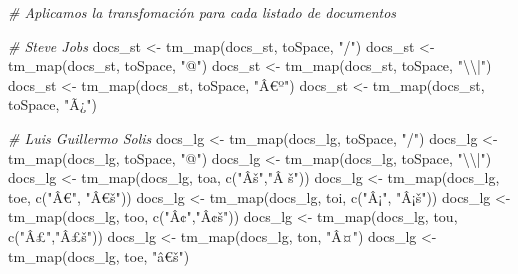 \documentclass[
]{article}
\newenvironment{Shaded}{\begin{snugshade}}{\end{snugshade}}
\newcommand{\CommentTok}[1]{\textcolor[rgb]{0.56,0.35,0.01}{\textit{#1}}}
\newcommand{\FunctionTok}[1]{\textcolor[rgb]{0.00,0.00,0.00}{#1}}
\newcommand{\NormalTok}[1]{#1}
\newcommand{\OtherTok}[1]{\textcolor[rgb]{0.56,0.35,0.01}{#1}}
\newcommand{\SpecialCharTok}[1]{\textcolor[rgb]{0.00,0.00,0.00}{#1}}
\newcommand{\StringTok}[1]{\textcolor[rgb]{0.31,0.60,0.02}{#1}}
\begin{document}
\begin{Shaded}
\begin{Highlighting}[]
\CommentTok{\# Aplicamos la transfomación para cada listado de documentos}

\CommentTok{\# Steve Jobs}
\NormalTok{docs\_st }\OtherTok{\textless{}{-}} \FunctionTok{tm\_map}\NormalTok{(docs\_st, toSpace, }\StringTok{"/"}\NormalTok{)}
\NormalTok{docs\_st }\OtherTok{\textless{}{-}} \FunctionTok{tm\_map}\NormalTok{(docs\_st, toSpace, }\StringTok{"@"}\NormalTok{)}
\NormalTok{docs\_st }\OtherTok{\textless{}{-}} \FunctionTok{tm\_map}\NormalTok{(docs\_st, toSpace, }\StringTok{"}\SpecialCharTok{\textbackslash{}\textbackslash{}}\StringTok{|"}\NormalTok{)}
\NormalTok{docs\_st }\OtherTok{\textless{}{-}} \FunctionTok{tm\_map}\NormalTok{(docs\_st, toSpace, }\StringTok{"Â€º"}\NormalTok{)}
\NormalTok{docs\_st }\OtherTok{\textless{}{-}} \FunctionTok{tm\_map}\NormalTok{(docs\_st, toSpace, }\StringTok{"Ã¿"}\NormalTok{)}

\CommentTok{\# Luis Guillermo Solis}
\NormalTok{docs\_lg }\OtherTok{\textless{}{-}} \FunctionTok{tm\_map}\NormalTok{(docs\_lg, toSpace, }\StringTok{"/"}\NormalTok{)}
\NormalTok{docs\_lg }\OtherTok{\textless{}{-}} \FunctionTok{tm\_map}\NormalTok{(docs\_lg, toSpace, }\StringTok{"@"}\NormalTok{)}
\NormalTok{docs\_lg }\OtherTok{\textless{}{-}} \FunctionTok{tm\_map}\NormalTok{(docs\_lg, toSpace, }\StringTok{"}\SpecialCharTok{\textbackslash{}\textbackslash{}}\StringTok{|"}\NormalTok{)}
\NormalTok{docs\_lg }\OtherTok{\textless{}{-}} \FunctionTok{tm\_map}\NormalTok{(docs\_lg, toa, }\FunctionTok{c}\NormalTok{(}\StringTok{"Âš"}\NormalTok{,}\StringTok{"Â š"}\NormalTok{))}
\NormalTok{docs\_lg }\OtherTok{\textless{}{-}} \FunctionTok{tm\_map}\NormalTok{(docs\_lg, toe, }\FunctionTok{c}\NormalTok{(}\StringTok{"Â€"}\NormalTok{, }\StringTok{"Â€š"}\NormalTok{))}
\NormalTok{docs\_lg }\OtherTok{\textless{}{-}} \FunctionTok{tm\_map}\NormalTok{(docs\_lg, toi, }\FunctionTok{c}\NormalTok{(}\StringTok{"Â¡"}\NormalTok{, }\StringTok{"Â¡š"}\NormalTok{))}
\NormalTok{docs\_lg }\OtherTok{\textless{}{-}} \FunctionTok{tm\_map}\NormalTok{(docs\_lg, too, }\FunctionTok{c}\NormalTok{(}\StringTok{"Â¢"}\NormalTok{,}\StringTok{"Â¢š"}\NormalTok{))}
\NormalTok{docs\_lg }\OtherTok{\textless{}{-}} \FunctionTok{tm\_map}\NormalTok{(docs\_lg, tou, }\FunctionTok{c}\NormalTok{(}\StringTok{"Â£"}\NormalTok{,}\StringTok{"Â£š"}\NormalTok{))}
\NormalTok{docs\_lg }\OtherTok{\textless{}{-}} \FunctionTok{tm\_map}\NormalTok{(docs\_lg, ton, }\StringTok{"Â¤"}\NormalTok{) }
\NormalTok{docs\_lg }\OtherTok{\textless{}{-}} \FunctionTok{tm\_map}\NormalTok{(docs\_lg, toe, }\StringTok{"â€š"}\NormalTok{) }


\end{Highlighting}
\end{Shaded}
\end{document}
